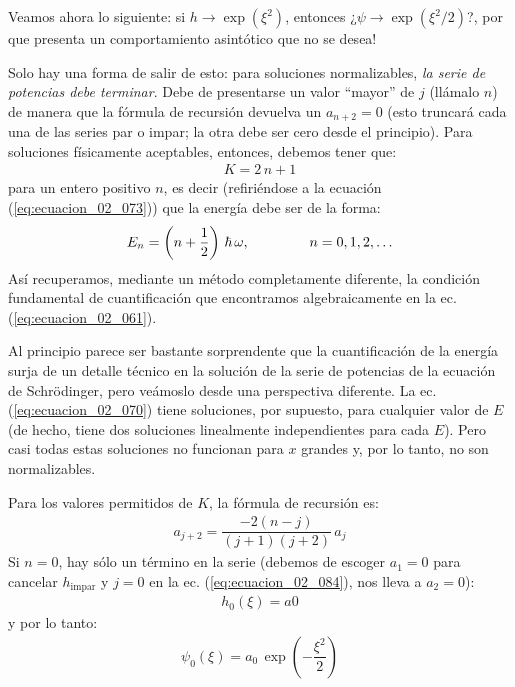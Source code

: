 \documentclass[12pt]{article}
\numberwithin{equation}{section}
\begin{document}
Veamos ahora lo siguiente: si $h \to \exp \left( \xi^{2} \right)$, entonces ¿$\psi \to \exp \left( \xi^{2}/2 \right)$?, por que presenta un comportamiento asintótico que no se desea!
\par
Solo hay una forma de salir de esto: para soluciones normalizables, \textit{la serie de potencias debe terminar}. Debe de presentarse un valor \enquote{mayor} de $j$ (llámalo $n$) de manera que la fórmula de recursión devuelva un $a_{n+2} = 0$ (esto truncará cada una de las series par o impar; la otra debe ser cero desde el principio). Para soluciones físicamente aceptables, entonces, debemos tener que:
\begin{align*}
K = 2 \, n + 1
\end{align*}
para un entero positivo $n$, es decir (refiriéndose a la ecuación (\ref{eq:ecuacion_02_073})) que la energía debe ser de la forma:
\begin{align}
E_{n} = \left( n + \dfrac{1}{2} \right) \, \hbar \, \omega , \hspace{1.5cm} n = 0, 1, 2, \ldots
\label{eq:ecuacion_02_083}
\end{align}
Así recuperamos, mediante un método completamente diferente, la condición fundamental de cuantificación que encontramos algebraicamente en la ec. (\ref{eq:ecuacion_02_061}).
\par
Al principio parece ser bastante sorprendente que la cuantificación de la energía surja de un detalle técnico en la solución de la serie de potencias de la ecuación de Schrödinger, pero veámoslo desde una perspectiva diferente. La ec. (\ref{eq:ecuacion_02_070}) tiene soluciones, por supuesto, para cualquier valor de $E$ (de hecho, tiene dos soluciones linealmente independientes para cada $E$). Pero casi todas estas soluciones no funcionan para $x$ grandes y, por lo tanto, no son normalizables.
\par
Para los valores permitidos de $K$, la fórmula de recursión es:
\begin{align}
a_{j+2} = \dfrac{- 2 (n - j)}{(j + 1)(j + 2)} \, a_{j}
\label{eq:ecuacion_02_084}
\end{align}
Si $n = 0$, hay sólo un término en la serie (debemos de escoger $a_{1} = 0$ para cancelar $h_{\text{impar}}$ y $j = 0$ en la ec. (\ref{eq:ecuacion_02_084}), nos lleva a $a_{2} = 0$):
\begin{align*}
h_{0} (\xi) = a{0}
\end{align*}
y por lo tanto:
\begin{align*}
\psi_{0} (\xi) = a_{0} \, \exp \left( - \dfrac{\xi^{2}}{2} \right)
\end{align*}
\end{document}
